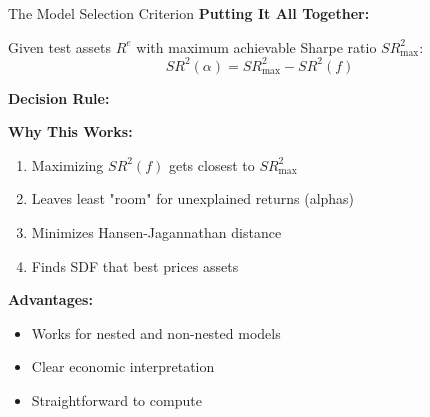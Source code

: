 \documentclass{beamer}
\begin{document}
\begin{frame}[allowframebreaks]{The Model Selection Criterion}
    \textbf{Putting It All Together:}
    
    Given test assets $R^e$ with maximum achievable Sharpe ratio $SR^2_{\max}$:
    \begin{equation*}
        SR^2(\alpha) = SR^2_{\max} - SR^2(f)
    \end{equation*}
    
    \vspace{0.3cm}
    \textbf{Decision Rule:}
    \begin{center}
    \end{center}
    
    \vspace{0.3cm}
    \textbf{Why This Works:}
    \begin{enumerate}
        \item Maximizing $SR^2(f)$ gets closest to $SR^2_{\max}$
        \item Leaves least "room" for unexplained returns (alphas)
        \item Minimizes Hansen-Jagannathan distance
        \item Finds SDF that best prices assets
    \end{enumerate}
    
    
    \textbf{Advantages:}
    \begin{itemize}
        \item Works for nested and non-nested models
        \item Clear economic interpretation
        \item Straightforward to compute
    \end{itemize}
\end{frame}
\end{document}
